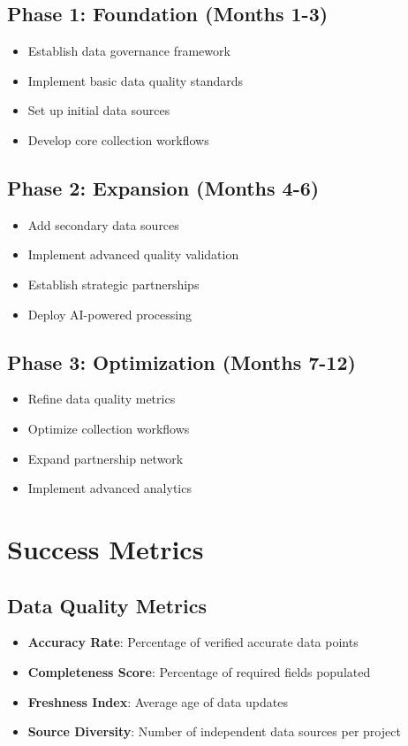 \documentclass[business]{../templates/infraradar-main}
\begin{document}
\subsection{Phase 1: Foundation (Months 1-3)}
\begin{itemize}
    \item Establish data governance framework
    \item Implement basic data quality standards
    \item Set up initial data sources
    \item Develop core collection workflows
\end{itemize}

\subsection{Phase 2: Expansion (Months 4-6)}
\begin{itemize}
    \item Add secondary data sources
    \item Implement advanced quality validation
    \item Establish strategic partnerships
    \item Deploy AI-powered processing
\end{itemize}

\subsection{Phase 3: Optimization (Months 7-12)}
\begin{itemize}
    \item Refine data quality metrics
    \item Optimize collection workflows
    \item Expand partnership network
    \item Implement advanced analytics
\end{itemize}

\section{Success Metrics}

\subsection{Data Quality Metrics}
\begin{itemize}
    \item \textbf{Accuracy Rate}: Percentage of verified accurate data points
    \item \textbf{Completeness Score}: Percentage of required fields populated
    \item \textbf{Freshness Index}: Average age of data updates
    \item \textbf{Source Diversity}: Number of independent data sources per project
\end{itemize}
\end{document}
